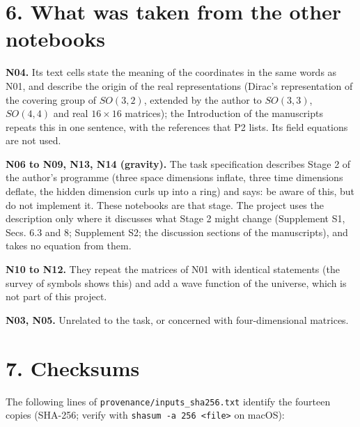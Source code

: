 \documentclass[
  10pt,
]{article}
\begin{document}
\hypertarget{what-was-taken-from-the-other-notebooks}{%
\section{6. What was taken from the other
notebooks}\label{what-was-taken-from-the-other-notebooks}}

\textbf{N04.} Its text cells state the meaning of the coordinates in the
same words as N01, and describe the origin of the real representations
(Dirac's representation of the covering group of \(SO(3,2)\), extended
by the author to \(SO(3,3)\), \(SO(4,4)\) and real \(16\times16\)
matrices); the Introduction of the manuscripts repeats this in one
sentence, with the references that P2 lists. Its field equations are not
used.

\textbf{N06 to N09, N13, N14 (gravity).} The task specification
describes Stage 2 of the author's programme (three space dimensions
inflate, three time dimensions deflate, the hidden dimension curls up
into a ring) and says: be aware of this, but do not implement it. These
notebooks are that stage. The project uses the description only where it
discusses what Stage 2 might change (Supplement S1, Secs. 6.3 and 8;
Supplement S2; the discussion sections of the manuscripts), and takes no
equation from them.

\textbf{N10 to N12.} They repeat the matrices of N01 with identical
statements (the survey of symbols shows this) and add a wave function of
the universe, which is not part of this project.

\textbf{N03, N05.} Unrelated to the task, or concerned with
four-dimensional matrices.

\hypertarget{checksums}{%
\section{7. Checksums}\label{checksums}}

The following lines of \texttt{provenance/inputs\_sha256.txt} identify
the fourteen copies (SHA-256; verify with
\texttt{shasum\ -a\ 256\ \textless{}file\textgreater{}} on macOS):
\end{document}
